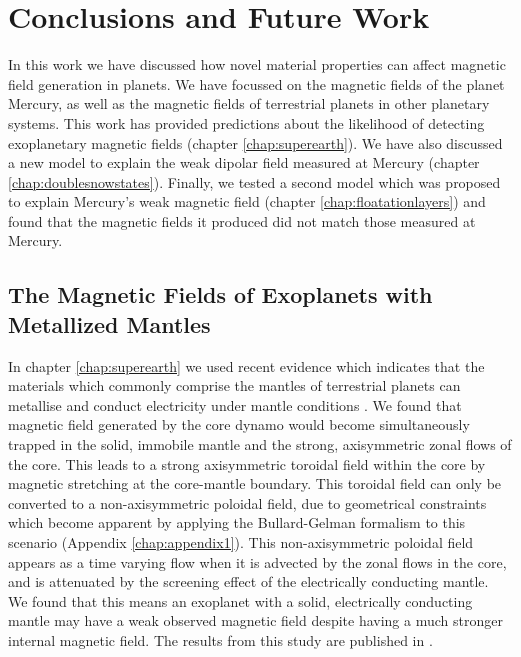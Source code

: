 
\chapter{Conclusions and Future Work}
\label{chap:conclusion}
In this work we have discussed how novel material properties can affect magnetic field generation in planets. We have focussed on the magnetic fields of the planet Mercury, as well as the magnetic fields of terrestrial planets in other planetary systems. This work has provided predictions about the likelihood of detecting exoplanetary magnetic fields (chapter \ref{chap:superearth}). We have also discussed a new model to explain the weak dipolar field measured at Mercury (chapter \ref{chap:doublesnowstates}). Finally, we tested a second model which was proposed \citep{smith2012, hauck2013} to explain Mercury's weak magnetic field (chapter \ref{chap:floatationlayers}) and found that the magnetic fields it produced did not match those measured at Mercury.

\section{The Magnetic Fields of Exoplanets with Metallized Mantles}
In chapter \ref{chap:superearth} we used recent evidence which indicates that the materials which commonly comprise the mantles of terrestrial planets can metallise and conduct electricity under mantle conditions \citep{nellis2010, tsuchiya2011, ohta2012}. We found that magnetic field generated by the core dynamo would become simultaneously trapped in the solid, immobile mantle and the strong, axisymmetric zonal flows of the core. This leads to a strong axisymmetric toroidal field within the core by magnetic stretching at the core-mantle boundary. This toroidal field can only be converted to a non-axisymmetric poloidal field, due to geometrical constraints which become apparent by applying the Bullard-Gelman formalism to this scenario (Appendix \ref{chap:appendix1}). This non-axisymmetric poloidal field appears as a time varying flow when it is advected by the zonal flows in the core, and is attenuated by the screening effect of the electrically conducting mantle. We found that this means an exoplanet with a solid, electrically conducting mantle may have a weak observed magnetic field despite having a much stronger internal magnetic field. The results from this study are published in \citet{vilim2013}.
 
